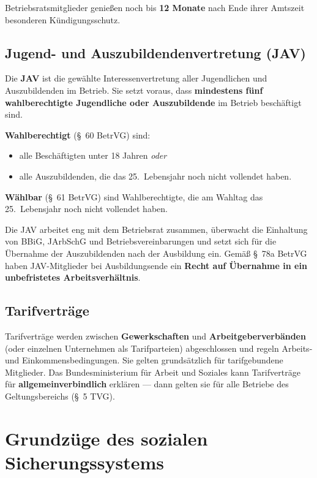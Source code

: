 \documentclass[11pt, a4paper]{article}
\begin{document}
\begin{merksatz}
Betriebsratsmitglieder genießen noch bis \textbf{12 Monate} nach Ende ihrer Amtszeit
besonderen Kündigungsschutz.
\end{merksatz}

\subsection{Jugend- und Auszubildendenvertretung (JAV)}

Die \textbf{JAV} ist die gewählte Interessenvertretung aller Jugendlichen und
Auszubildenden im Betrieb. Sie setzt voraus, dass \textbf{mindestens fünf wahlberechtigte
Jugendliche oder Auszubildende} im Betrieb beschäftigt sind.

\textbf{Wahlberechtigt} (§~60 BetrVG) sind:
\begin{itemize}
  \item alle Beschäftigten unter 18 Jahren \emph{oder}
  \item alle Auszubildenden, die das 25.~Lebensjahr noch nicht vollendet haben.
\end{itemize}

\textbf{Wählbar} (§~61 BetrVG) sind Wahlberechtigte, die am Wahltag das 25.~Lebensjahr
noch nicht vollendet haben.

Die JAV arbeitet eng mit dem Betriebsrat zusammen, überwacht die Einhaltung von BBiG,
JArbSchG und Betriebsvereinbarungen und setzt sich für die Übernahme der Auszubildenden
nach der Ausbildung ein. Gemäß §~78a BetrVG haben JAV-Mitglieder bei Ausbildungsende
ein \textbf{Recht auf Übernahme in ein unbefristetes Arbeitsverhältnis}.

\subsection{Tarifverträge}

Tarifverträge werden zwischen \textbf{Gewerkschaften} und \textbf{Arbeitgeberverbänden}
(oder einzelnen Unternehmen als Tarifparteien) abgeschlossen und regeln Arbeits- und
Einkommensbedingungen. Sie gelten grundsätzlich für tarifgebundene Mitglieder. Das
Bundesministerium für Arbeit und Soziales kann Tarifverträge für \textbf{allgemeinverbindlich}
erklären --- dann gelten sie für alle Betriebe des Geltungsbereichs (§~5 TVG).

\section{Grundzüge des sozialen Sicherungssystems}
\end{document}

